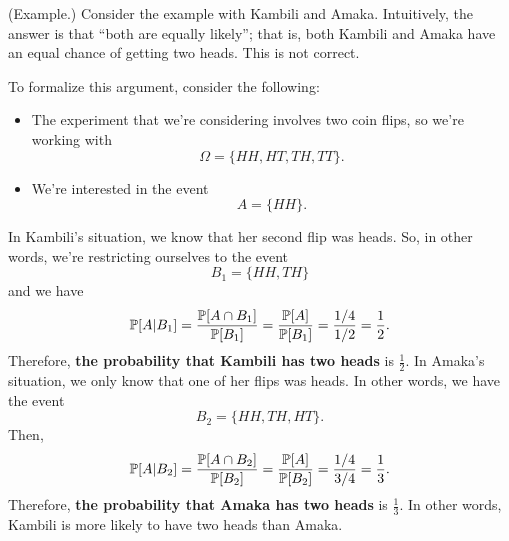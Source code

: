 \documentclass[letterpaper]{article}
\begin{document}
\begin{mdframed}
    (Example.) Consider the example with Kambili and Amaka. Intuitively, the answer is that ``both are equally likely''; that is, both Kambili and Amaka have an equal chance of getting two heads. This is not correct. 

    \bigskip 

    To formalize this argument, consider the following: 
    \begin{itemize}
        \item The experiment that we're considering involves two coin flips, so we're working with 
        \[\Omega = \{HH, HT, TH, TT\}.\]
        \item We're interested in the event
        \[A = \{HH\}.\]
    \end{itemize}
    In Kambili's situation, we know that her second flip was heads. So, in other words, we're restricting ourselves to the event 
    \[B_1 = \{HH, TH\}\] and we have 
    \[\mathbb{P}[A | B_1] = \frac{\mathbb{P}[A \cap B_1]}{\mathbb{P}[B_1]} = \frac{\mathbb{P}[A]}{\mathbb{P}[B_1]} = \frac{1/4}{1/2} = \frac{1}{2}.\]
    Therefore, \textbf{the probability that Kambili has two heads} is $\frac{1}{2}$. In Amaka's situation, we only know that one of her flips was heads. In other words, we have the event 
    \[B_2 = \{HH, TH, HT\}.\]
    Then, 
    \[\mathbb{P}[A | B_2] = \frac{\mathbb{P}[A \cap B_2]}{\mathbb{P}[B_2]} = \frac{\mathbb{P}[A]}{\mathbb{P}[B_2]} = \frac{1/4}{3/4} = \frac{1}{3}.\]
    Therefore, \textbf{the probability that Amaka has two heads} is $\frac{1}{3}$. In other words, Kambili is more likely to have two heads than Amaka.  
\end{mdframed}
\end{document}

